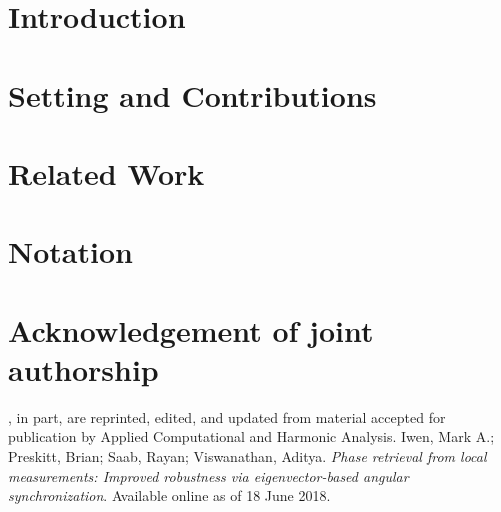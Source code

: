 \section{Introduction}

\section{Setting and Contributions}

\section{Related Work}
\label{sec:relatedwork}

\section{Notation}
\label{sec:notation}

\section*{Acknowledgement of joint authorship}

, in part, are reprinted, edited, and updated from material accepted for publication by Applied Computational and Harmonic Analysis.  Iwen, Mark A.; Preskitt, Brian; Saab, Rayan; Viswanathan, Aditya.  \emph{Phase retrieval from local measurements: Improved robustness via eigenvector-based angular synchronization}.  Available online as of 18 June 2018.
